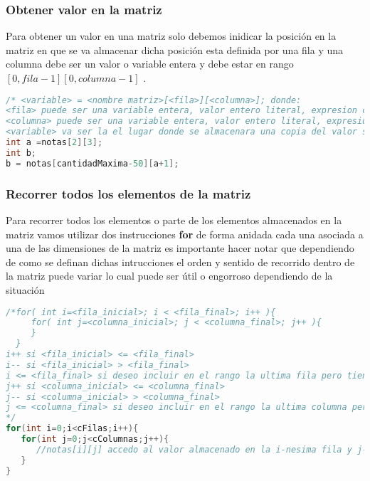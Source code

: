 \subsubsection{Obtener valor en la matriz}

Para obtener un valor en una matriz solo debemos inidicar la posición en la matriz en que se va almacenar dicha posición esta definida por una fila y una columna debe ser un valor o variable entera y debe estar en rango $[0,fila-1][0,columna-1]$ .

\begin{lstlisting}[language=Java]
/* <variable> = <nombre matriz>[<fila>][<columna>]; donde:
<fila> puede ser una variable entera, valor entero literal, expresion cuyo resultado sea entero e indicada la fila a la que quiero acceder en la matriz
<columna> puede ser una variable entera, valor entero literal, expresion cuyo resultado sea entero e indicada la columna a la que quiero acceder en la matriz 
<variable> va ser la el lugar donde se almacenara una copia del valor solicitado al arreglo, debe ser del mismo tipo de dato del arreglo */
int a =notas[2][3];
int b;
b = notas[cantidadMaxima-50][a+1];
\end{lstlisting}

\subsubsection{Recorrer todos los elementos de la matriz}

Para recorrer todos los elementos o parte de los elementos almacenados en la matriz vamos utilizar dos instrucciones \textbf{for} de forma anidada cada una asociada a una de las dimensiones de la matriz es importante hacer notar que dependiendo de como se definan dichas intrucciones el orden y sentido de recorrido dentro de la matriz puede variar lo cual puede ser útil o engorroso dependiendo de la situación

\begin{lstlisting}[language=Java]
/*for( int i=<fila_inicial>; i < <fila_final>; i++ ){
     for( int j=<columna_inicial>; j < <columna_final>; j++ ){
     } 
  } 
i++ si <fila_inicial> <= <fila_final>
i-- si <fila_inicial> > <fila_final>
i <= <fila_final> si deseo incluir en el rango la ultima fila pero tiene que ser una fila valida de la matriz
j++ si <columna_inicial> <= <columna_final>
j-- si <columna_inicial> > <columna_final>
j <= <columna_final> si deseo incluir en el rango la ultima columna pero tiene que ser una columna valida de la matriz
*/	
for(int i=0;i<cFilas;i++){
   for(int j=0;j<cColumnas;j++){
      //notas[i][j] accedo al valor almacenado en la i-nesima fila y j-nesima de la matriz
   }
}
	
\end{lstlisting}

